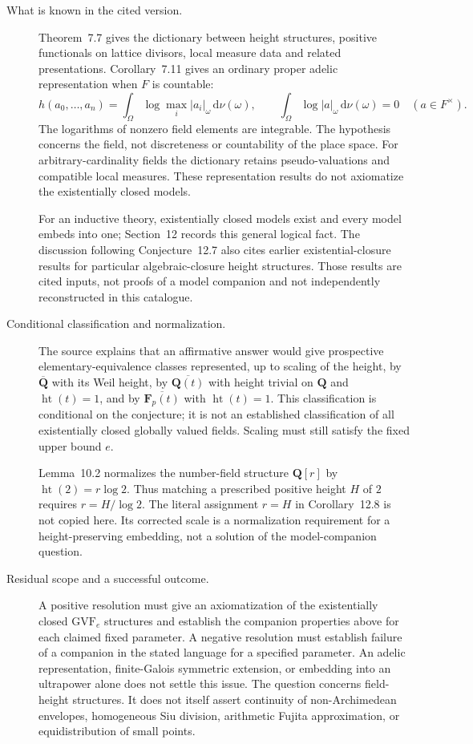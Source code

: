 \documentclass[11pt,a4paper]{article}
\theoremstyle{definition}
\theoremstyle{remark}
\newcommand{\rd}{\mathrm d}
\begin{document}
\begin{description}
\item[What is known in the cited version.]
Theorem~7.7 gives the dictionary between height structures, positive
functionals on lattice divisors, local measure data and related
presentations. Corollary~7.11 gives an ordinary proper adelic
representation when $F$ is countable:
\[
 h(a_0,\ldots,a_n)
  =\int_\Omega\log\max_i|a_i|_\omega\,\rd\nu(\omega),\qquad
 \int_\Omega\log|a|_\omega\,\rd\nu(\omega)=0
       \quad(a\in F^\times).
\]
The logarithms of nonzero field elements are integrable. The hypothesis
concerns the field, not discreteness or countability of the place space.
For arbitrary-cardinality fields the dictionary retains pseudo-valuations
and compatible local measures. These representation results do not
axiomatize the existentially closed models.

For an inductive theory, existentially closed models exist and every
model embeds into one; Section~12 records this general logical fact.
The discussion following Conjecture~12.7 also cites earlier
existential-closure results for particular algebraic-closure height
structures. Those results are cited inputs, not proofs of a model
companion and not independently reconstructed in this catalogue.

\item[Conditional classification and normalization.]
The source explains that an affirmative answer would give prospective
elementary-equivalence classes represented, up to scaling of the height,
by $\overline{\mathbf Q}$ with its Weil height, by
$\overline{\mathbf Q(t)}$ with height trivial on $\mathbf Q$ and
$\operatorname{ht}(t)=1$, and by
$\overline{\mathbf F_p(t)}$ with $\operatorname{ht}(t)=1$.
This classification is conditional on the conjecture; it is not an
established classification of all existentially closed globally valued
fields. Scaling must still satisfy the fixed upper bound $e$.

Lemma~10.2 normalizes the number-field structure $\mathbf Q[r]$ by
$\operatorname{ht}(2)=r\log2$. Thus matching a prescribed positive height
$H$ of $2$ requires $r=H/\log2$. The literal assignment $r=H$ in
Corollary~12.8 is not copied here. Its corrected scale is a normalization
requirement for a height-preserving embedding, not a solution of the
model-companion question.

\item[Residual scope and a successful outcome.]
A positive resolution must give an axiomatization of the existentially
closed $\mathrm{GVF}_e$ structures and establish the companion properties
above for each claimed fixed parameter. A negative resolution must
establish failure of a companion in the stated language for a specified
parameter. An adelic representation, finite-Galois symmetric extension,
or embedding into an ultrapower alone does not settle this issue.
The question concerns field-height structures. It does not itself assert
continuity of non-Archimedean envelopes, homogeneous Siu division,
arithmetic Fujita approximation, or equidistribution of small points.
\end{description}
\end{document}
